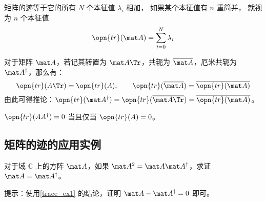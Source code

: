 \begin{theorem}{}
矩阵的迹等于它的所有 $N$ 个本征值 $\lambda_i$ 相加， 如果某个本征值有 $n$ 重简并， 就视为 $n$ 个本征值
\begin{equation}
\opn{tr}(\mat A) = \sum_{i=0}^N \lambda_i
\end{equation}
\end{theorem}


\begin{exercise}{}\label{trace_exe1}
对于矩阵 $\mat A$，若记其转置为 $\mat A\Tr$，共轭为 $\overline{\mat A}$，厄米共轭为 $\mat A^\dagger$，那么有：
\begin{equation}
\opn{tr}(A\Tr)=\opn{tr}(A), \qquad \opn{tr}(\overline{\mat A})=\overline{\opn{tr}(\mat A)}
\end{equation}
由此可得推论：$\opn{tr}(\mat A^\dagger)=\opn{tr}(\overline{\mat A\Tr})=\overline{\opn{tr}(\mat A)}$。
\end{exercise}

\begin{example}{}\label{trace_ex1}
$\opn{tr}(AA^\dagger)=0$ 当且仅当 $\opn{tr}(A)=0$。
\end{example}

\subsection{矩阵的迹的应用实例}

\begin{exercise}{}
对于域 $\mathbb{C}$ 上的方阵 $\mat A$，如果 $\mat A^2=\mat A\mat A^\dagger$，求证 $\mat A=\mat A^\dagger$。

提示：使用\autoref{trace_ex1} 的结论，证明 $\mat A-\mat A^\dagger=0$ 即可。
\end{exercise}
